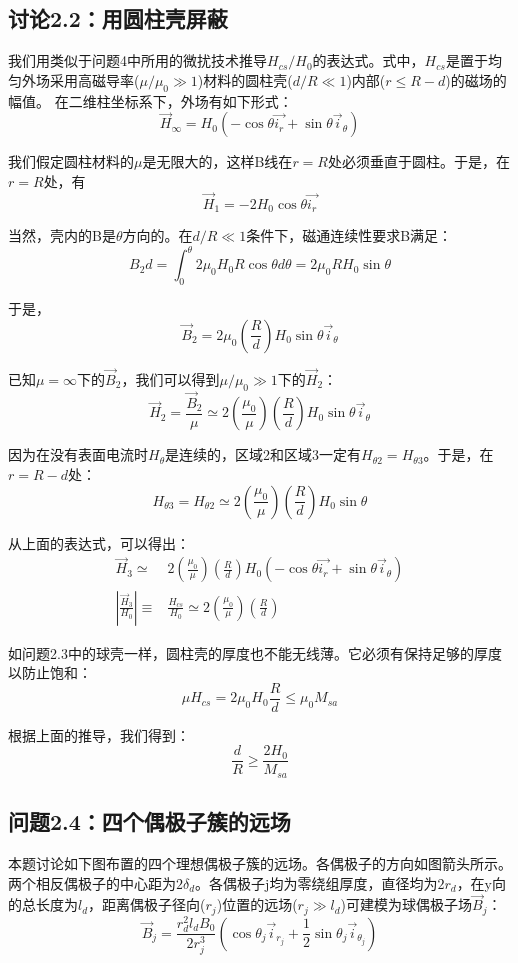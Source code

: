 \subsection{讨论2.2：用圆柱壳屏蔽}
我们用类似于问题4中所用的微扰技术推导$H_{cs}/H_0$的表达式。式中，$H_{cs}$是置于均匀外场采用高磁导率($\mu/\mu_0 \gg 1$)材料的圆柱壳($d/R\ll 1$)内部($r\le R-d$)的磁场的幅值。
在二维柱坐标系下，外场有如下形式：
\begin{equation*}
\vec{H}_\infty =H_0 (-\cos\theta \vec{i_r}+\sin\theta\vec{i}_\theta) \tag{2.40}
\end{equation*}


我们假定圆柱材料的$\mu$是无限大的，这样B线在$r=R$处必须垂直于圆柱。于是，在$r=R$处，有
$$\vec{H}_1 =-2 H_0 \cos\theta \vec{i_r}$$

当然，壳内的B是$\theta$方向的。在$d/R\ll 1$条件下，磁通连续性要求B满足：
$$B_2 d=\int_{0}^{\theta}2\mu_0 H_0 R\cos\theta d\theta=2\mu_0 R H_0 \sin\theta$$

于是，
$$\vec{B}_2=2\mu_0 (\frac{R}{d})H_0 \sin\theta \vec{i}_\theta$$

已知$\mu=\infty$下的$\vec{B}_2$，我们可以得到$\mu/\mu_0 \gg 1$下的$\vec{H}_2$：
$$\vec{H}_2= \frac{\vec{B}_2}{\mu}\simeq 2(\frac{\mu_0}{\mu}) (\frac{R}{d})H_0 \sin\theta \vec{i}_\theta$$

因为在没有表面电流时$H_\theta$是连续的，区域2和区域3一定有$H_{\theta 2}=H_{\theta 3}$。于是，在$r=R-d$处：
$$H_{\theta 3}=H_{\theta 2}\simeq 2(\frac{\mu_0}{\mu}) (\frac{R}{d})H_0 \sin\theta$$

从上面的表达式，可以得出：
\begin{align}
\vec{H}_3 \simeq& 2(\frac{\mu_0}{\mu}) (\frac{R}{d})H_0 (-\cos\theta \vec{i_r}+\sin\theta\vec{i}_\theta)\nonumber\\
\left|\frac{\vec{H}_3}{H_0}\right|\equiv&\frac{H_{cs}}{H_0}\simeq 2(\frac{\mu_0}{\mu}) (\frac{R}{d})
\end{align}

如问题2.3中的球壳一样，圆柱壳的厚度也不能无线薄。它必须有保持足够的厚度以防止饱和：
$$\mu H_{cs}=2\mu_0 H_0 \frac{R}{d}\le \mu_0 M_{sa}$$

根据上面的推导，我们得到：
\begin{equation}
\frac{d}{R}\ge \frac{2H_0}{M_{sa}}
\end{equation}


\subsection{问题2.4：四个偶极子簇的远场}
本题讨论如下图布置的四个理想偶极子簇的远场。各偶极子的方向如图箭头所示。两个相反偶极子的中心距为$2\delta_d$。各偶极子j均为零绕组厚度，直径均为$2r_d$，在y向的总长度为$l_d$，距离偶极子径向($r_j$)位置的远场($r_j \gg l_d$)可建模为球偶极子场$\vec{B}_j$：
\begin{equation}
\vec{B}_j=\frac{r_d^2 l_d B_0}{2r_j^3}(\cos\theta_j \vec{i}_{r_j}+\frac{1}{2} \sin\theta_j \vec{i}_{\theta_j})
\end{equation}

